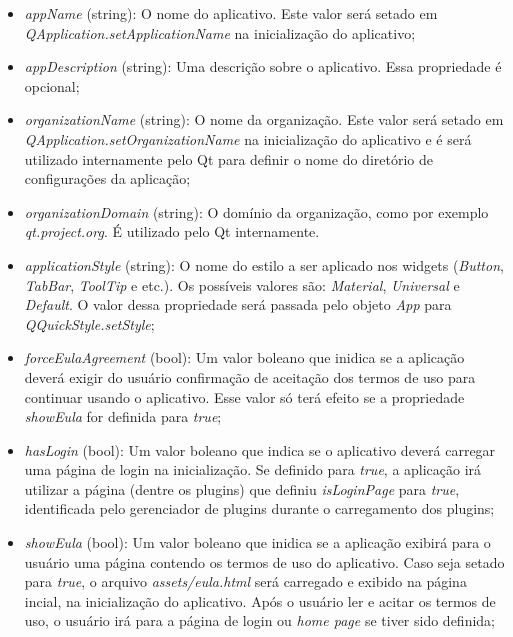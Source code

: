 \begin{itemize}
	\item \textit{appName} (string): O nome do aplicativo. Este valor será setado em \textit{QApplication.setApplicationName} na inicialização do aplicativo;

	\item \textit{appDescription} (string): Uma descrição sobre o aplicativo. Essa propriedade é opcional;

	\item \textit{organizationName} (string): O nome da organização. Este valor será setado em \textit{QApplication.setOrganizationName} na inicialização do aplicativo e é será utilizado internamente pelo Qt para definir o nome do diretório de configurações da aplicação;

	\item \textit{organizationDomain} (string): O domínio da organização, como por exemplo \textit{qt.project.org}. É utilizado pelo Qt internamente.

	\item \textit{applicationStyle} (string): O nome do estilo a ser aplicado nos widgets (\textit{Button}, \textit{TabBar}, \textit{ToolTip} e etc.). Os possíveis valores são: \textit{Material}, \textit{Universal} e \textit{Default}. O valor dessa propriedade será passada pelo objeto \textit{App} para \textit{QQuickStyle.setStyle};

	\item \textit{forceEulaAgreement} (bool): Um valor boleano que inidica se a aplicação deverá exigir do usuário confirmação de aceitação dos termos de uso para continuar usando o aplicativo. Esse valor só terá efeito se a propriedade \textit{showEula} for definida para \textit{true};

	\item \textit{hasLogin} (bool): Um valor boleano que indica se o aplicativo deverá carregar uma página de login na inicialização. Se definido para \textit{true}, a aplicação irá utilizar a página (dentre os plugins) que definiu \textit{isLoginPage} para \textit{true}, identificada pelo gerenciador de plugins durante o carregamento dos plugins;

	\item \textit{showEula} (bool): Um valor boleano que inidica se a aplicação exibirá para o usuário uma página contendo os termos de uso do aplicativo. Caso seja setado para \textit{true}, o arquivo \textit{assets/eula.html} será carregado e exibido na página incial, na inicialização do aplicativo. Após o usuário ler e acitar os termos de uso, o usuário irá para a página de login ou \textit{home page} se tiver sido definida;


\end{itemize}
